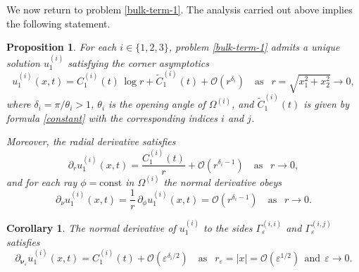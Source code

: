 \documentclass[reqno]{amsart}            %
\newtheorem{corollary}{Corollary}[section]
\newtheorem{proposition}{Proposition}[section]
\numberwithin{equation}{section}
\begin{document}
	We now return to problem \eqref{bulk-term-1}. The analysis carried out above
	implies the following statement.
	\begin{proposition}\label{propo-2-5}
		For each $i\in\{1,2,3\}$, problem \eqref{bulk-term-1} admits a unique solution
		$u^{(i)}_1$ satisfying the corner asymptotics
		\begin{equation}\label{asym-5}
			u^{(i)}_1(x,t)
			= C^{(i)}_1(t)\,\log r + \widetilde{C}^{(i)}_1(t)
			+ \mathcal{O}\!\left(r^{\delta_i}\right)
			\quad \text{as } \ \  r=\sqrt{x_1^2+x_2^2}\to 0,
		\end{equation}
		where $\delta_i=\pi/\theta_i>1$, $\theta_i$ is the opening angle of
		$\Omega^{(i)}$, and $\widetilde{C}^{(i)}_1(t)$ is given by formula
		\eqref{constant} with the corresponding indices $i$ and $j$.
		
		Moreover, the radial derivative satisfies
		\begin{equation}\label{asym-deriv-r}
			\partial_r u^{(i)}_1(x,t)
			= \frac{C^{(i)}_1(t)}{r}
			+ \mathcal{O}\!\left(r^{\delta_i-1}\right)
			\quad \text{as } \ \ r\to 0,
		\end{equation}
		and for each ray $\phi=\mathrm{const}$ in $\Omega^{(i)}$ the normal derivative
		obeys
		\begin{equation}\label{asym-deriv-normal}
			\partial_{\nu} u^{(i)}_1(x,t)
			= \frac{1}{r}\,\partial_\phi u^{(i)}_1(x,t)
			= \mathcal{O}\!\left(r^{\delta_i-1}\right)
			\quad \text{as } \ \ r\to 0.
		\end{equation}
	\end{proposition}
	\begin{corollary}\label{corollarity-2-3}
		The normal derivative of $u^{(i)}_1$ to the sides $\Gamma_\varepsilon^{(i,i)}$ and $\Gamma_\varepsilon^{(i,j)}$ satisfies
		\begin{equation}\label{asym-normal-line-final}
			\partial_{\boldsymbol{\nu}_\varepsilon} u^{(i)}_1(x,t)
			= C^{(i)}_1(t)
			+ \mathcal{O}\!\left(\varepsilon^{\delta_i/2}\right)
			\quad \text{as } \ \ r_\varepsilon = |x| = \mathcal{O}\!\left(\varepsilon^{1/2}\right) \ \ \text{and} \ \ \varepsilon\to 0.
		\end{equation}
	\end{corollary}
\end{document}

